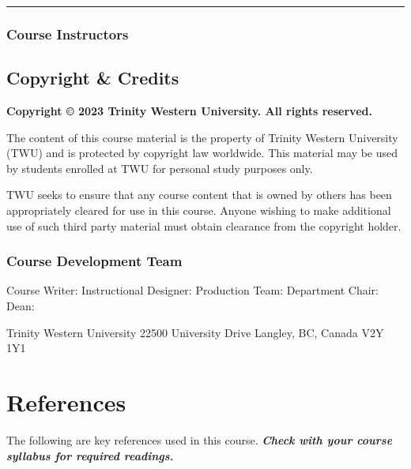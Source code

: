 \documentclass[
]{book}
\begin{document}
\begin{center}\rule{0.5\linewidth}{0.5pt}\end{center}

\hypertarget{course-instructors}{%
\subsection*{Course Instructors}\label{course-instructors}}

\hypertarget{copyright-credits}{%
\section*{Copyright \& Credits}\label{copyright-credits}}

\textbf{Copyright © 2023 Trinity Western University. All rights reserved.}

The content of this course material is the property of Trinity Western University (TWU) and is protected by copyright law worldwide. This material may be used by students enrolled at TWU for personal study purposes only.

TWU seeks to ensure that any course content that is owned by others has been appropriately cleared for use in this course. Anyone wishing to make additional use of such third party material must obtain clearance from the copyright holder.

\hypertarget{course-development-team}{%
\subsection{Course Development Team}\label{course-development-team}}

Course Writer:
Instructional Designer:
Production Team:
Department Chair:
Dean:

Trinity Western University
22500 University Drive
Langley, BC, Canada \textbar{} V2Y 1Y1

\hypertarget{references-4}{%
\chapter*{References}\label{references-4}}

The following are key references used in this course. \textbf{\emph{Check with your course syllabus for required readings.}}

  
\end{document}
